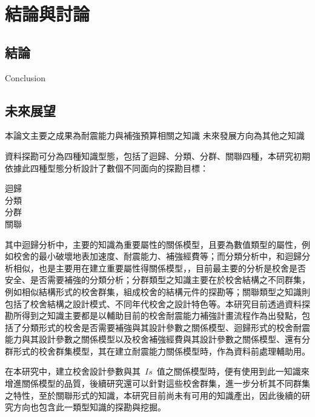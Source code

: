 \renewcommand\thetable{\arabic{chapter}-\arabic{table}}
\chapter{結論與討論}
\label{cha:conclusions}


\section{結論}

Conclusion


\section{未來展望} 

本論文主要之成果為耐震能力與補強預算相關之知識
未來發展方向為其他之知識


資料探勘可分為四種知識型態，包括了迴歸、分類、分群、關聯四種，本研究初期依據此四種型態分析設計了數個不同面向的探勘目標：

\begin{description}
  \item[迴歸]
  \item[分類]
  \item[分群]
  \item[關聯]
\end{description}


其中迴歸分析中，主要的知識為重要屬性的關係模型，且要為數值類型的屬性，例如校舍的最小破壞地表加速度、耐震能力、補強經費等；而分類分析中，和迴歸分析相似，也是主要用在建立重要屬性得關係模型，，目前最主要的分析是校舍是否安全、是否需要補強的分類分析；分群類型之知識主要在於校舍結構之不同群集，例如相似結構形式的校舍群集，組成校舍的結構元件的探勘等；關聯類型之知識則包括了校舍結構之設計模式、不同年代校舍之設計特色等。本研究目前透過資料探勘所得到之知識主要都是以輔助目前的校舍耐震能力補強計畫流程作為出發點，包括了分類形式的校舍是否需要補強與其設計參數之關係模型、迴歸形式的校舍耐震能力與其設計參數之關係模型以及校舍補強經費與其設計參數之關係模型、還有分群形式的校舍群集模型，其在建立耐震能力關係模型時，作為資料前處理輔助用。



在本研究中，建立校舍設計參數與其~$Is$~值之關係模型時，便有使用到此一知識來增進關係模型的品質，後續研究還可以針對這些校舍群集，進一步分析其不同群集之特性，至於關聯形式的知識，本研究目前尚未有可用的知識產出，因此後續的研究方向也包含此一類型知識的探勘與挖掘。


